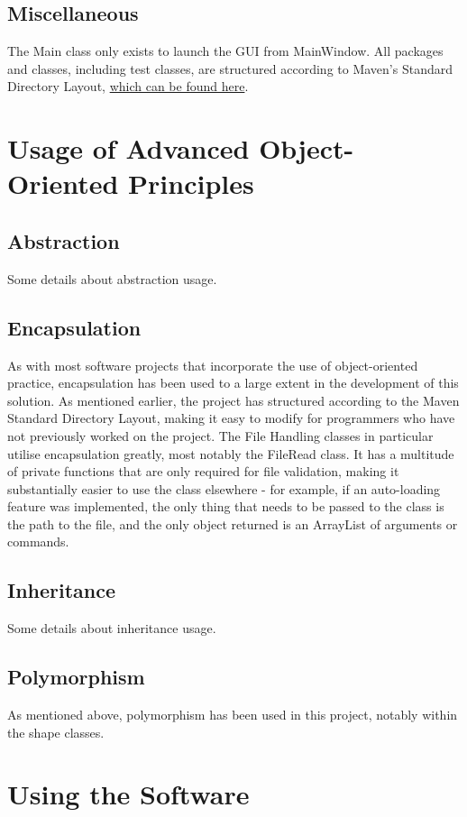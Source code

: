 \documentclass[12pt]{article} %
\begin{document}
\subsection{Miscellaneous}
The Main class only exists to launch the GUI from MainWindow. All packages and classes, including test classes, are structured according to Maven's Standard Directory Layout, {\color{blue} \href{https://maven.apache.org/guides/introduction/introduction-to-the-standard-directory-layout.html}{which can be found here}}.
\newpage

\section{Usage of Advanced Object-Oriented Principles}
\subsection{Abstraction}
Some details about abstraction usage.
\subsection{Encapsulation}
As with most software projects that incorporate the use of object-oriented practice, encapsulation has been used to a large extent in the development of this solution. As mentioned earlier, the project has structured according to the Maven Standard Directory Layout, making it easy to modify for programmers who have not previously worked on the project. The File Handling classes in particular utilise encapsulation greatly, most notably the FileRead class. It has a multitude of private functions that are only required for file validation, making it substantially easier to use the class elsewhere - for example, if an auto-loading feature was implemented, the only thing that needs to be passed to the class is the path to the file, and the only object returned is an ArrayList of arguments or commands.
\subsection{Inheritance}
Some details about inheritance usage.
\subsection{Polymorphism}
As mentioned above, polymorphism has been used in this project, notably within the shape classes. 

\newpage

\section{Using the Software}
\end{document}
